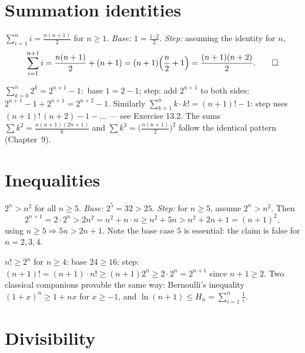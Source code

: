 \section{Summation identities}

\begin{example}\label{ex:gauss}
$\displaystyle\sum_{i=1}^{n} i = \frac{n(n+1)}{2}$ for $n \geq 1$.
\emph{Base:} $1 = \frac{1 \cdot 2}{2}$. \emph{Step:} assuming the identity
for $n$,
\[
\sum_{i=1}^{n+1} i = \frac{n(n+1)}{2} + (n+1)
= (n+1)\Bigl(\frac{n}{2} + 1\Bigr) = \frac{(n+1)(n+2)}{2}. \qed
\]
\end{example}

\begin{example}
$\displaystyle\sum_{k=0}^{n} 2^{k} = 2^{n+1} - 1$:\ base $1 = 2 - 1$; step:
add $2^{n+1}$ to both sides: $2^{n+1} - 1 + 2^{n+1} = 2^{n+2} - 1$.
Similarly $\sum_{k=1}^{n} k \cdot k! = (n+1)! - 1$: step uses
$(n+1)!\,(n+2) - 1 - \ldots$ --- see Exercise 13.2. The sums
$\sum k^2 = \frac{n(n+1)(2n+1)}{6}$ and
$\sum k^3 = \bigl(\frac{n(n+1)}{2}\bigr)^2$ follow the identical pattern
(Chapter~9).
\end{example}

\section{Inequalities}

\begin{example}\label{ex:2nn2}
$2^{n} > n^{2}$ for all $n \geq 5$.
\emph{Base:} $2^5 = 32 > 25$. \emph{Step:} for $n \geq 5$, assume
$2^n > n^2$. Then
\[
2^{n+1} = 2 \cdot 2^{n} > 2n^{2} = n^{2} + n \cdot n
\geq n^{2} + 5n > n^{2} + 2n + 1 = (n+1)^{2},
\]
using $n \geq 5 \Rightarrow 5n > 2n + 1$. Note the base case $5$ is
essential: the claim is false for $n = 2, 3, 4$.
\end{example}

\begin{example}
$n! \geq 2^{n}$ for $n \geq 4$: base $24 \geq 16$; step:
$(n+1)! = (n+1) \cdot n! \geq (n+1)2^{n} \geq 2 \cdot 2^{n} = 2^{n+1}$
since $n + 1 \geq 2$. Two classical companions provable the same way:
Bernoulli's inequality $(1+x)^{n} \geq 1 + nx$ for $x \geq -1$, and
$\ln(n+1) \leq H_n = \sum_{i=1}^n \frac{1}{i}$.
\end{example}

\section{Divisibility}

